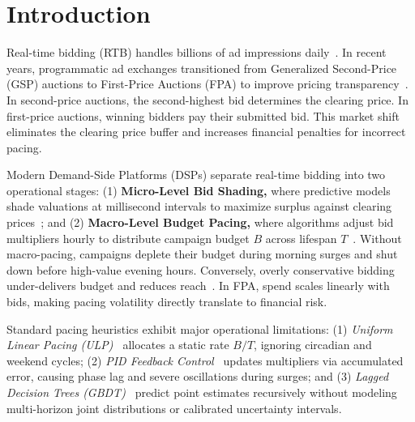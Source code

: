 \documentclass[sigconf]{acmart}
\begin{document}


\maketitle

\section{Introduction}
Real-time bidding (RTB) handles billions of ad impressions daily~\cite{zhang2014real}. In recent years, programmatic ad exchanges transitioned from Generalized Second-Price (GSP) auctions to First-Price Auctions (FPA) to improve pricing transparency~\cite{despotakis2021first,zhou2021bid}. In second-price auctions, the second-highest bid determines the clearing price. In first-price auctions, winning bidders pay their submitted bid. This market shift eliminates the clearing price buffer and increases financial penalties for incorrect pacing.

Modern Demand-Side Platforms (DSPs) separate real-time bidding into two operational stages: (1) \textbf{Micro-Level Bid Shading,} where predictive models shade valuations at millisecond intervals to maximize surplus against clearing prices~\cite{zhou2021bid,balseiro2021budget}; and (2) \textbf{Macro-Level Budget Pacing,} where algorithms adjust bid multipliers hourly to distribute campaign budget $B$ across lifespan $T$~\cite{xu2015smart,grigas2017profit}. Without macro-pacing, campaigns deplete their budget during morning surges and shut down before high-value evening hours. Conversely, overly conservative bidding under-delivers budget and reduces reach~\cite{bhalgat2012online}. In FPA, spend scales linearly with bids, making pacing volatility directly translate to financial risk.

Standard pacing heuristics exhibit major operational limitations: (1) \emph{Uniform Linear Pacing (ULP)~\cite{xu2015smart}} allocates a static rate $B/T$, ignoring circadian and weekend cycles; (2) \emph{PID Feedback Control~\cite{lee2013real}} updates multipliers via accumulated error, causing phase lag and severe oscillations during surges; and (3) \emph{Lagged Decision Trees (GBDT)~\cite{ke2017lightgbm}} predict point estimates recursively without modeling multi-horizon joint distributions or calibrated uncertainty intervals.
\end{document}
